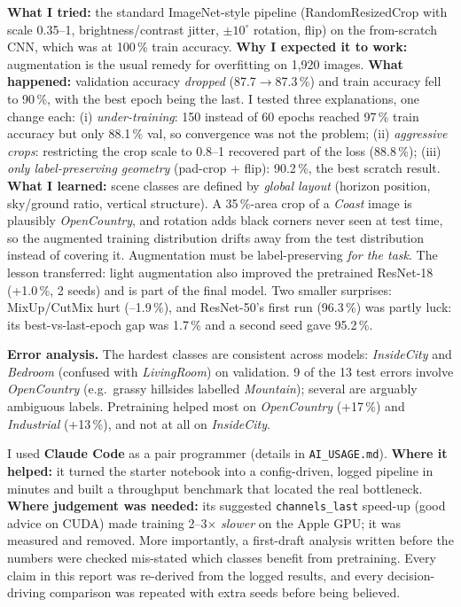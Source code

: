 \documentclass[10pt]{article}
\newcommand{\sect}[1]{\vspace{3pt}{\large\bfseries #1}\par\vspace{1pt}}
\begin{document}
\sect{4. Failure analysis: strong augmentation made things worse}
\textbf{What I tried:} the standard ImageNet-style pipeline (RandomResizedCrop with scale 0.35--1, brightness/contrast jitter, $\pm10^\circ$ rotation, flip) on the from-scratch CNN, which was at 100\,\% train accuracy.
\textbf{Why I expected it to work:} augmentation is the usual remedy for overfitting on 1,920 images.
\textbf{What happened:} validation accuracy \emph{dropped} (87.7$\to$87.3\,\%) and train accuracy fell to 90\,\%, with the best epoch being the last. I tested three explanations, one change each: (i) \emph{under-training}: 150 instead of 60 epochs reached 97\,\% train accuracy but only 88.1\,\% val, so convergence was not the problem; (ii) \emph{aggressive crops}: restricting the crop scale to 0.8--1 recovered part of the loss (88.8\,\%); (iii) \emph{only label-preserving geometry} (pad-crop + flip): 90.2\,\%, the best scratch result.
\textbf{What I learned:} scene classes are defined by \emph{global layout} (horizon position, sky/ground ratio, vertical structure). A 35\,\%-area crop of a \emph{Coast} image is plausibly \emph{OpenCountry}, and rotation adds black corners never seen at test time, so the augmented training distribution drifts away from the test distribution instead of covering it. Augmentation must be label-preserving \emph{for the task}. The lesson transferred: light augmentation also improved the pretrained ResNet-18 (+1.0\,\%, 2 seeds) and is part of the final model. Two smaller surprises: MixUp/CutMix hurt (--1.9\,\%), and ResNet-50's first run (96.3\,\%) was partly luck: its best-vs-last-epoch gap was 1.7\,\% and a second seed gave 95.2\,\%.

\textbf{Error analysis.} The hardest classes are consistent across models: \emph{InsideCity} and \emph{Bedroom} (confused with \emph{LivingRoom}) on validation. 9 of the 13 test errors involve \emph{OpenCountry} (e.g.\ grassy hillsides labelled \emph{Mountain}); several are arguably ambiguous labels. Pretraining helped most on \emph{OpenCountry} (+17\,\%) and \emph{Industrial} (+13\,\%), and not at all on \emph{InsideCity}.

\sect{5. AI + Human}
I used \textbf{Claude Code} as a pair programmer (details in \texttt{AI\_USAGE.md}). \textbf{Where it helped:} it turned the starter notebook into a config-driven, logged pipeline in minutes and built a throughput benchmark that located the real bottleneck. \textbf{Where judgement was needed:} its suggested \texttt{channels\_last} speed-up (good advice on CUDA) made training 2--3$\times$ \emph{slower} on the Apple GPU; it was measured and removed. More importantly, a first-draft analysis written before the numbers were checked mis-stated which classes benefit from pretraining. Every claim in this report was re-derived from the logged results, and every decision-driving comparison was repeated with extra seeds before being believed.
\end{document}
